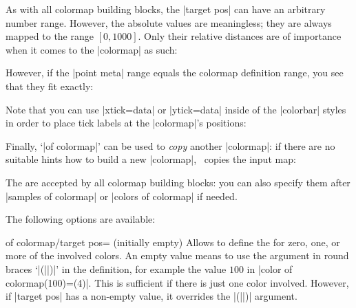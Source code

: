 {\begin{enumerate}
	As with all colormap building blocks, the |target pos| can have an arbitrary number range. However, the absolute values are meaningless; they are always mapped to the range $[0,1000]$. Only their relative distances are of importance when it comes to the |colormap| as such:
\begin{codeexample}[]
\pgfplotscolorbardrawstandalone[
	colormap={example}{%
		of colormap={viridis,
			target pos={-10,-3,0,1,2},
            sample for=const,
		}
	},
	colorbar horizontal,
	colormap access=const]
\end{codeexample}
	However, if the |point meta| range equals the colormap definition range, you see that they fit exactly:
\begin{codeexample}[]
\pgfplotscolorbardrawstandalone[
	colormap={example}{%
		of colormap={viridis,
			target pos={-10,-3,0,1,2},
            sample for=const,
		}
	},
	point meta min=-10,point meta max=2,
	colorbar horizontal,
	colormap access=const]
\end{codeexample}
	Note that you can use |xtick=data| or |ytick=data| inside of the |colorbar| styles in order to place tick labels at the |colormap|'s positions:
\begin{codeexample}[]
\pgfplotscolorbardrawstandalone[
	colormap={example}{%
		of colormap={viridis,
			target pos={-10,-3,0,1,2},
            sample for=const,
		}
	},
	point meta min=-10,point meta max=2,
	colorbar horizontal,
	colorbar style={xtick=data},
	colormap access=const]
\end{codeexample}

	Finally, `|of colormap|' can be used to \emph{copy} another |colormap|: if there are no suitable hints how to build a new |colormap|, \PGFPlots\ copies the input map:
\begin{codeexample}[]
\pgfplotscolorbardrawstandalone[
	colormap={example}{%
		of colormap={viridis},
	},
	colorbar horizontal,
	colormap access=const]
\end{codeexample}

	The  are accepted by all colormap building blocks: you can also specify them after |samples of colormap| or |colors of colormap| if needed.
	
	The following options are available:

\begin{pgfplotskey}{of colormap/target pos= (initially empty)}
	Allows to define the  for zero, one, or more of the involved colors. An empty value means to use the argument in round braces `|(||)|' in the definition, for example the value $100$ in |color of colormap(100)=(4)|. This is sufficient if there is just one color involved. However, if |target pos| has a non-empty value, it overrides the |(||)| argument.


\end{pgfplotskey}
\end{enumerate}}
